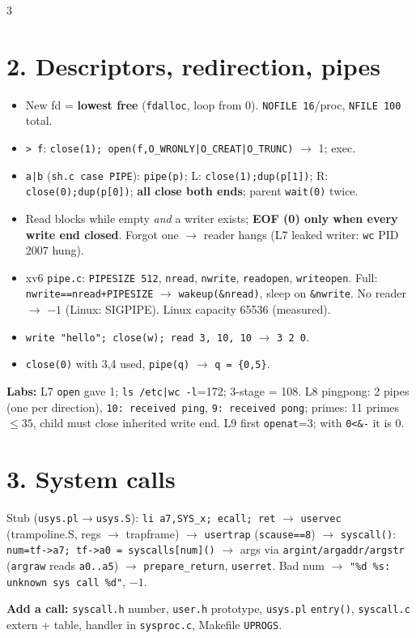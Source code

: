 \documentclass[9pt]{extarticle}
\newcommand{\cc}[1]{\texttt{#1}}
\newcommand{\ra}{$\rightarrow$}
\begin{document}
\begin{multicols*}{3}
\section{2. Descriptors, redirection, pipes}
\begin{itemize}
\item New fd = \textbf{lowest free} (\cc{fdalloc}, loop from 0). \cc{NOFILE 16}/proc, \cc{NFILE 100} total.
\item \cc{> f}: \cc{close(1); open(f,O\_WRONLY|O\_CREAT|O\_TRUNC)} \ra{} 1; exec.
\item \cc{a|b} (\cc{sh.c case PIPE}): \cc{pipe(p)}; L: \cc{close(1);dup(p[1])}; R: \cc{close(0);dup(p[0])}; \textbf{all close both ends}; parent \cc{wait(0)} twice.
\item Read blocks while empty \emph{and} a writer exists; \textbf{EOF (0) only when every write end closed}. Forgot one \ra{} reader hangs (L7 leaked writer: \cc{wc} PID 2007 hung).
\item xv6 \cc{pipe.c}: \cc{PIPESIZE 512}, \cc{nread}, \cc{nwrite}, \cc{readopen}, \cc{writeopen}. Full: \cc{nwrite==nread+PIPESIZE} \ra{} \cc{wakeup(\&nread)}, sleep on \cc{\&nwrite}. No reader \ra{} $-1$ (Linux: SIGPIPE). Linux capacity 65536 (measured).
\item \cc{write "hello"; close(w); read 3, 10, 10} \ra{} \cc{3 2 0}.
\item \cc{close(0)} with 3,4 used, \cc{pipe(q)} \ra{} \cc{q = \{0,5\}}.
\end{itemize}
\textbf{Labs:} L7 \cc{open} gave 1; \cc{ls /etc|wc -l}=172; 3-stage = 108. L8 pingpong: 2 pipes (one per direction), \cc{10: received ping}, \cc{9: received pong}; primes: 11 primes $\le 35$, child must close inherited write end. L9 first \cc{openat}=3; with \cc{0<\&-} it is 0.

\section{3. System calls}
Stub (\cc{usys.pl}\ra\cc{usys.S}): \cc{li a7,SYS\_x; ecall; ret} \ra{} \cc{uservec} (trampoline.S, regs \ra{} trapframe) \ra{} \cc{usertrap} (\cc{scause==8}) \ra{} \cc{syscall()}: \cc{num=tf->a7; tf->a0 = syscalls[num]()} \ra{} args via \cc{argint/argaddr/argstr} (\cc{argraw} reads \cc{a0..a5}) \ra{} \cc{prepare\_return}, \cc{userret}. Bad num \ra{} \cc{"\%d \%s: unknown sys call \%d"}, $-1$.

\textbf{Add a call:} \cc{syscall.h} number, \cc{user.h} prototype, \cc{usys.pl} \cc{entry()}, \cc{syscall.c} extern + table, handler in \cc{sysproc.c}, Makefile \cc{UPROGS}.


\end{multicols*}
\end{document}
